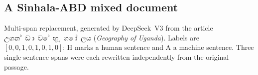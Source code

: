 %
%
%


\subsection*{A Sinhala-ABD mixed document}

Multi-span replacement, generated by DeepSeek~V3 from the article
\si{උගන්ඩාවේ භූගෝලය} (\emph{Geography of Uganda}). Labels are
$[0,0,1,0,1,0,1,0]$; H marks a human sentence and A a machine sentence. Three
single-sentence spans were each rewritten independently from the original
passage.

